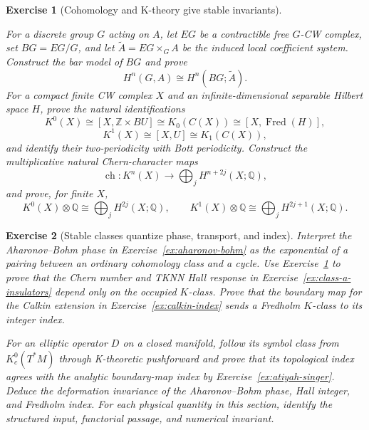 \documentclass{article}
\newtheorem{exercise}{Exercise}
\begin{document}
\begin{exercise}[Cohomology and K-theory give stable invariants]
\label{ex:k-models-synthesis}\leavevmode\par
\textit{For a discrete group $G$ acting on $A$, let $EG$ be a contractible
free $G$-CW complex, set $BG=EG/G$, and let
$\widetilde A=EG\times_GA$ be the induced local coefficient system.
Construct the bar model of $BG$ and prove}
\[
H^n(G,A)\cong H^n(BG;\widetilde A).
\]
\textit{For a compact finite CW complex $X$ and an infinite-dimensional
separable Hilbert space $H$, prove the natural identifications}
\cite{atiyah-k-theory,swan-vector-bundles}
\[
K^0(X)\cong[X,\mathbb Z\times BU]
\cong K_0(C(X))\cong[X,\operatorname{Fred}(H)],
\]
\[
K^1(X)\cong[X,U]\cong K_1(C(X)),
\]
\textit{and identify their two-periodicity with Bott periodicity. Construct
the multiplicative natural Chern-character maps}
\[
\operatorname{ch}:K^n(X)\longrightarrow
\bigoplus_jH^{n+2j}(X;\mathbb Q),
\]
\textit{and prove, for finite $X$,}
\[
K^0(X)\otimes\mathbb Q\cong\bigoplus_jH^{2j}(X;\mathbb Q),
\qquad
K^1(X)\otimes\mathbb Q\cong\bigoplus_jH^{2j+1}(X;\mathbb Q).
\]
\end{exercise}

\begin{exercise}[Stable classes quantize phase, transport, and index]
\leavevmode\par
\textit{Interpret the Aharonov--Bohm phase in
Exercise~\ref{ex:aharonov-bohm} as the exponential of a pairing between an
ordinary cohomology class and a cycle. Use
Exercise~\ref{ex:k-models-synthesis} to prove that the Chern number and TKNN
Hall response in Exercise~\ref{ex:class-a-insulators} depend only on the
occupied $K$-class. Prove that the boundary map for the Calkin extension in
Exercise~\ref{ex:calkin-index} sends a Fredholm $K$-class to its integer
index.}

\textit{For an elliptic operator $D$ on a closed manifold, follow its symbol
class from $K_c^0(T^*M)$ through K-theoretic pushforward and prove that its
topological index agrees with the analytic boundary-map index by
Exercise~\ref{ex:atiyah-singer}. Deduce the deformation invariance of the
Aharonov--Bohm phase, Hall integer, and Fredholm index. For each physical
quantity in this section, identify the structured input, functorial passage,
and numerical invariant.}
\end{exercise}
\end{document}
